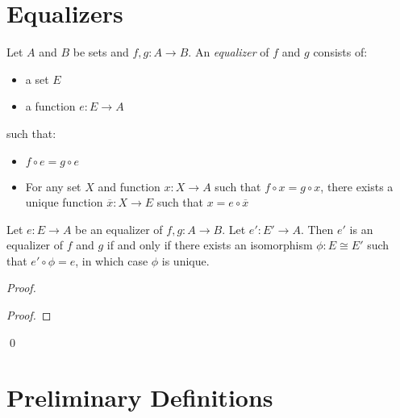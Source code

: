 \section{Equalizers}

\begin{df}[Equalizer]
  Let $A$ and $B$ be sets and $f,g : A \rightarrow B$. An \emph{equalizer} of $f$ and $g$ consists of:
  \begin{itemize}
    \item
    a set $E$
    \item
    a function $e : E \rightarrow A$
  \end{itemize}
  such that:
  \begin{itemize}
    \item
    $f \circ e = g \circ e$
    \item
    For any set $X$ and function $x : X \rightarrow A$ such that $f \circ x = g \circ x$, there exists a unique function $\overline{x} : X \rightarrow E$ such that $x = e \circ \overline{x}$
  \end{itemize}
\end{df}

\begin{prop}
  Let $e : E \rightarrow A$ be an equalizer of $f, g : A \rightarrow B$. Let $e' : E' \rightarrow A$. Then $e'$ is an equalizer of $f$ and $g$ if and only if there exists an isomorphism $\phi : E \cong E'$ such that $e' \circ \phi = e$, in which case $\phi$ is unique.
\end{prop}

\begin{proof}
  \pf
  \begin{proof}
  \end{proof}
  \qed
\end{proof}
\section{Preliminary Definitions}


